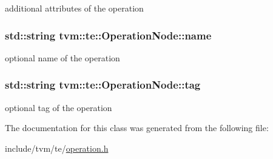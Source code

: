 additional attributes of the operation 

\subsubsection[{\texorpdfstring{name}{name}}]{\setlength{\rightskip}{0pt plus 5cm}std\+::string tvm\+::te\+::\+Operation\+Node\+::name}\hypertarget{classtvm_1_1te_1_1OperationNode_ad2fd6f140257f7b3c311f88374fa74d2}{}\label{classtvm_1_1te_1_1OperationNode_ad2fd6f140257f7b3c311f88374fa74d2}


optional name of the operation 

\subsubsection[{\texorpdfstring{tag}{tag}}]{\setlength{\rightskip}{0pt plus 5cm}std\+::string tvm\+::te\+::\+Operation\+Node\+::tag}\hypertarget{classtvm_1_1te_1_1OperationNode_ae6ac4336e7dc2df84f128fc97a6cdb9b}{}\label{classtvm_1_1te_1_1OperationNode_ae6ac4336e7dc2df84f128fc97a6cdb9b}


optional tag of the operation 



The documentation for this class was generated from the following file\+:\begin{DoxyCompactItemize}
\item 
include/tvm/te/\hyperlink{operation_8h}{operation.\+h}\end{DoxyCompactItemize}
